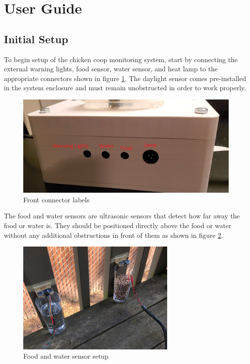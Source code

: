 \documentclass{article}
\begin{document}
\section{User Guide}
\subsection{Initial Setup}
To begin setup of the chicken coop monitoring system, start by connecting the external warning lights, food sensor, water sensor, and heat lamp to the appropriate connectors shown in figure \ref{fig:front-connector}.  The daylight sensor comes pre-installed in the system enclosure and must remain unobstructed in order to work properly.

\begin{figure}[H]
    \centering
    \includegraphics[width=\textwidth]{fig/panel-labels.png}
    \caption{Front connector labels}
    \label{fig:front-connector}
\end{figure}

The food and water sensors are ultrasonic sensors that detect how far away the food or water is.  They should be positioned directly above the food or water without any additional obstructions in front of them as shown in figure \ref{fig:sensor-setup}.

\begin{figure}[H]
    \centering
    \includegraphics[width=0.7\textwidth]{fig/sensor-setup.jpg}
    \caption{Food and water sensor setup}
    \label{fig:sensor-setup}
\end{figure}
\end{document}
